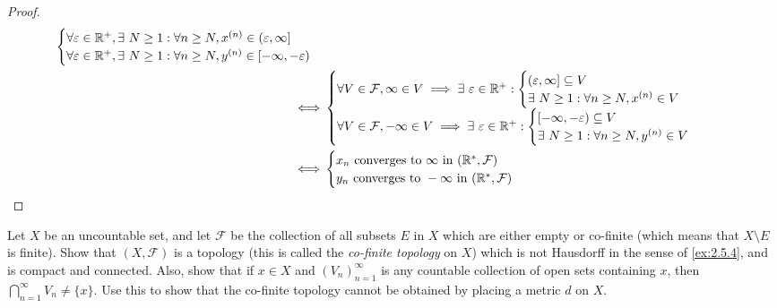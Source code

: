 \begin{proof}
\begin{align*}
\begin{cases}
             \forall \varepsilon \in \R^+, \exists\ N \geq 1 : \forall n \geq N, x^{(n)} \in (\varepsilon, \infty] \\
             \forall \varepsilon \in \R^+, \exists\ N \geq 1 : \forall n \geq N, y^{(n)} \in [-\infty, -\varepsilon)
           \end{cases} \\
    \iff & \begin{cases}
             \forall V \in \mathcal{F}, \infty \in V \implies \exists\ \varepsilon \in \R^+ : \begin{cases}
                                                                                         (\varepsilon, \infty] \subseteq V \\
                                                                                         \exists\ N \geq 1 : \forall n \geq N, x^{(n)} \in V
                                                                                       \end{cases} \\
             \forall V \in \mathcal{F}, -\infty \in V \implies \exists\ \varepsilon \in \R^+ : \begin{cases}
                                                                                          [-\infty, -\varepsilon) \subseteq V \\
                                                                                          \exists\ N \geq 1 : \forall n \geq N, y^{(n)} \in V
                                                                                        \end{cases}
           \end{cases}                   \\
    \iff & \begin{cases}
             x_n \text{ converges to } \infty \text{ in } (\R^*, \mathcal{F})  \\
             y_n \text{ converges to } -\infty \text{ in } (\R^*, \mathcal{F}) \\
           \end{cases}
  \end{align*}
\end{proof}

\begin{ex}\label{ex:2.5.6}
  Let \(X\) be an uncountable set, and let \(\mathcal{F}\) be the collection of all subsets \(E\) in \(X\) which are either empty or co-finite (which means that \(X \setminus E\) is finite).
  Show that \((X, \mathcal{F})\) is a topology (this is called the \emph{co-finite topology} on \(X\)) which is not Hausdorff in the sense of \cref{ex:2.5.4}, and is compact and connected.
  Also, show that if \(x \in X\) and \((V_n)_{n = 1}^\infty\) is any countable collection of open sets containing \(x\), then \(\bigcap_{n = 1}^\infty V_n \neq \{x\}\).
  Use this to show that the co-finite topology cannot be obtained by placing a metric \(d\) on \(X\).
\end{ex}


